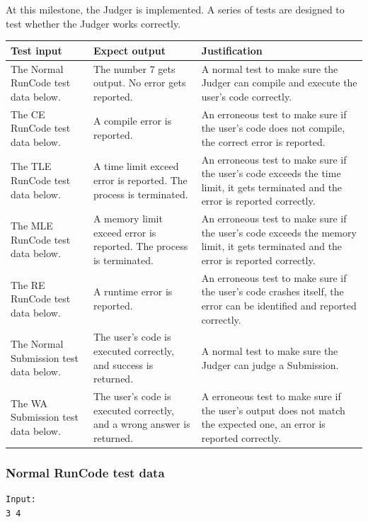 \documentclass[a4paper]{report}
\begin{document}
At this milestone, the Judger is implemented. A series of tests are designed to test whether the Judger works correctly.

\begin{tabulary}{\textwidth}{|L|L|L|}
    \hline
    Test input & Expect output & Justification \\
    \hline
    The Normal RunCode test data below. & The number 7 gets output. No error gets reported. & A normal test to make sure the Judger can compile and execute the user's code correctly. \\
    \hline
    The CE RunCode test data below. & A compile error is reported. & An erroneous test to make sure if the user's code does not compile, the correct error is reported. \\
    \hline
    The TLE RunCode test data below. & A time limit exceed error is reported. The process is terminated. & An erroneous test to make sure if the user's code exceeds the time limit, it gets terminated and the error is reported correctly. \\
    \hline
    The MLE RunCode test data below. & A memory limit exceed error is reported. The process is terminated. & An erroneous test to make sure if the user's code exceeds the memory limit, it gets terminated and the error is reported correctly. \\
    \hline
    The RE RunCode test data below. & A runtime error is reported. & An erroneous test to make sure if the user's code crashes itself, the error can be identified and reported correctly. \\
    \hline
    The Normal Submission test data below. & The user's code is executed correctly, and success is returned. & A normal test to make sure the Judger can judge a Submission. \\
    \hline
    The WA Submission test data below. & The user's code is executed correctly, and a wrong answer is returned. & A erroneous test to make sure if the user's output does not match the expected one, an error is reported correctly. \\
    \hline
\end{tabulary}

\subsubsection{Normal RunCode test data}

\begin{verbatim}
Input:
3 4    
\end{verbatim}
\end{document}
